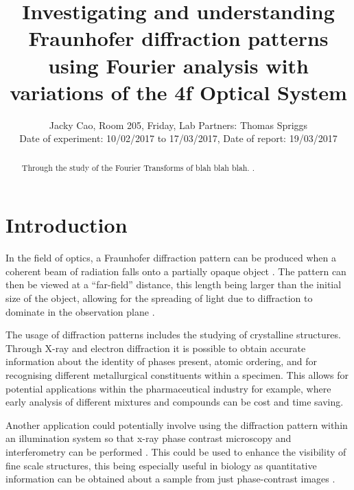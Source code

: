 \documentclass[twocolumn]{revtex4}
\begin{document}
\textheight=26.385cm

\title{Investigating and understanding Fraunhofer diffraction patterns using Fourier analysis with variations of the 4f Optical System}
 
\author{Jacky Cao, Room 205, Friday, Lab Partners: Thomas Spriggs \\ Date of experiment: 10/02/2017 to 17/03/2017, Date of report: 19/03/2017}

\begin{abstract}              
Through the study of the Fourier Transforms of blah blah blah. \cite{crc}. 
\end{abstract}

\maketitle

\section{Introduction} 
\vspace{-2ex} 

In the field of optics, a Fraunhofer diffraction pattern can be produced when a coherent beam of radiation falls onto a partially opaque object \cite{mathmethods}. The pattern can then be viewed at a ``far-field'' distance, this length being larger than the initial size of the object, allowing for the spreading of light due to diffraction to dominate in the observation plane \cite{of2f}. 

The usage of diffraction patterns includes the studying of crystalline structures. Through X-ray and electron diffraction it is possible to obtain accurate information about the identity of phases present, atomic ordering, and for recognising different metallurgical constituents within a specimen. This allows for potential applications within the pharmaceutical industry for example, where early analysis of different mixtures and compounds can be cost and time saving. \cite{elecdiffraction, xraypharma}

Another application could potentially involve using the diffraction pattern within an illumination system so that x-ray phase contrast microscopy and interferometry can be performed \cite{singleslit}. This could be used to enhance the visibility of fine scale structures, this being especially useful in biology as quantitative information can be obtained about a sample from just phase-contrast images \cite{xrayphase}.
\end{document}
